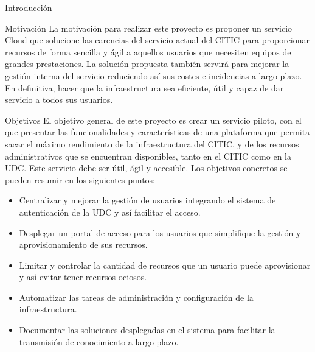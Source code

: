 \begin{chapter}{Introducción}


\begin{section}{Motivación}
La motivación para realizar este proyecto es proponer un servicio Cloud que solucione las carencias del servicio actual del CITIC para proporcionar recursos de forma sencilla y ágil a aquellos usuarios que necesiten equipos de grandes prestaciones. La solución propuesta también servirá para mejorar la gestión interna del servicio reduciendo así sus costes e incidencias a largo plazo. En definitiva, hacer que la infraestructura sea eficiente, útil y capaz de dar servicio a todos sus usuarios.
\end{section}
\begin{section}{Objetivos}
El objetivo general de este proyecto es crear un servicio piloto, con el que presentar las funcionalidades y características de una plataforma que permita sacar el máximo rendimiento de la infraestructura del CITIC, y de los recursos administrativos que se encuentran disponibles, tanto en el CITIC como en la UDC. Este servicio debe ser útil, ágil y accesible. Los objetivos concretos se pueden resumir en los siguientes puntos:
\begin{itemize}
    \item Centralizar y mejorar la gestión de usuarios integrando el sistema de autenticación de la UDC y así facilitar el acceso.
    \item Desplegar un portal de acceso para los usuarios que simplifique la gestión y aprovisionamiento de sus recursos.
    \item Limitar y controlar la cantidad de recursos que un usuario puede aprovisionar y así evitar tener recursos ociosos.
    \item Automatizar las tareas de administración y configuración de la infraestructura.
    \item Documentar las soluciones desplegadas en el sistema para facilitar la transmisión de conocimiento a largo plazo.
\end{itemize}
\end{section}


\end{chapter}
